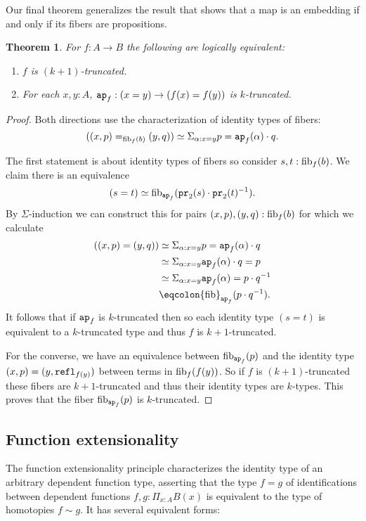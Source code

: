 \documentclass{amsart}
\theoremstyle{theorem}
\newtheorem*{thm}{Theorem}
\theoremstyle{definition}
\theoremstyle{remark}
\newcommand{\0}{\mathbbe{0}}
\newcommand{\1}{\mathbbe{1}}
\newcommand{\2}{\mathbbe{2}}
\newcommand{\3}{\mathbbe{3}}
\newcommand{\4}{\mathbbe{4}}
\newcommand{\term}[1]{{\textup{\texttt{#1}}}}
\newcommand{\type}[1]{{\textup{#1}}}
\newcommand{\pr}{\term{pr}}
\newcommand{\refl}{\term{refl}}
\newcommand{\ap}{\term{ap}}
\newcommand{\fib}{\type{fib}}
\begin{document}
Our final theorem generalizes the result that shows that a map is an embedding if and only if its fibers are propositions.
\begin{thm} For $f \colon A \to B$ the following are logically equivalent:
\begin{enumerate}
\item $f$ is $(k+1)$-truncated.
\item For each $x,y:A$, $\ap_f :(x=y) \to (f(x)=f(y))$ is $k$-truncated.
\end{enumerate}
\end{thm}
\begin{proof}
Both directions use the characterization of identity types of fibers:
\[ ((x,p) =_{\fib_f(b)}(y,q) ) \simeq \Sigma_{\alpha: x=y} p = \ap_f(\alpha) \cdot q.\]

The first statement is about identity types of fibers so consider $s,t : \fib_f(b)$.  We claim there is an equivalence \[ (s=t) \simeq \fib_{\ap_f}(\pr_2(s)\cdot \pr_2(t)^{-1}).\] By $\Sigma$-induction we can construct this for pairs $(x,p), (y,q) : \fib_f(b)$ for which we calculate
\begin{align*} ((x,p)=(y,q)) &\simeq \Sigma_{\alpha : x= y} p = \ap_f(\alpha)\cdot q  \\ &\simeq \Sigma_{\alpha:x=y} \ap_f(\alpha)\cdot q = p \\ &\simeq \Sigma_{\alpha :x=y} \ap_f(\alpha) = p \cdot q^{-1} \\
&\eqcolon \fib_{\ap_f}(p\cdot q{^{-1}}).
\end{align*}
It follows that if $\ap_f$ is $k$-truncated then so each identity type $(s=t)$ is equivalent to a $k$-truncated type and thus $f$ is $k+1$-truncated.

For the converse, we have an equivalence between $\fib_{\ap_f}(p)$ and the identity type $(x,p) =(y,\refl_{f(y)})$ between terms in $\fib_f(f(y))$. So if $f$ is $(k+1)$-truncated these fibers are $k+1$-truncated and thus  their identity types are $k$-types. This proves that the fiber $\fib_{\ap_f}(p)$ is $k$-truncated.
\end{proof}

\subsection*{Function extensionality}

The function extensionality principle characterizes the identity type of an arbitrary dependent function type, asserting that the type $f=g$ of identifications between dependent functions $f,g : \Pi_{x:A} B(x)$ is equivalent to the type of homotopies $f \sim g$. It has several equivalent forms:
\end{document}
